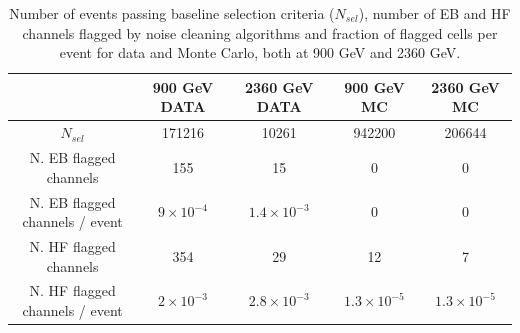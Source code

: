 \begin{table}[!ht]
  \begin{center}
    \begin{tabular}{|c|c|c|c|c|}
      \hline
                                   & 900 GeV DATA  & 2360 GeV DATA & 900 GeV MC & 2360 GeV MC \\
      \hline\hline
      $N_{sel}$                    & 171216           & 10261              & 942200              & 206644                 \\
      \hline\hline
      N. EB flagged channels             & 155              & 15                 & 0                   & 0                      \\
      N. EB flagged channels / event     & $9 \times 10^{-4}$ & $1.4 \times 10^{-3}$ & 0                   & 0                      \\
      \hline\hline
      N. HF flagged channels             & 354              & 29                 & 12                  & 7                      \\
      N. HF flagged channels / event     & $2 \times 10^{-3}$ & $2.8 \times 10^{-3}$ & $1.3 \times 10^{-5}$  & $1.3 \times 10^{-5}$     \\
      \hline\hline
  \end{tabular}
    \caption{Number of events passing baseline selection criteria ($N_{sel}$), number of EB and HF channels flagged by noise cleaning algorithms 
and fraction of flagged cells per event for data and Monte Carlo, both at 900 GeV and 2360 GeV.}
    \label{tab:noiseCleaning}
  \end{center}
\end{table}






